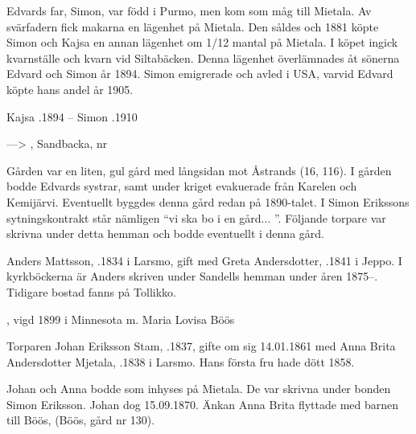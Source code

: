 Edvards far, Simon, var född i Purmo, men kom som måg till Mietala. Av svärfadern fick makarna en lägenhet på Mietala. Den såldes och 1881 köpte Simon och Kajsa en annan lägenhet om 1/12 mantal på Mietala. I köpet ingick kvarnställe och kvarn vid Siltabäcken. Denna lägenhet överlämnades åt sönerna Edvard och Simon år 1894. Simon emigrerade och avled i USA, varvid Edvard köpte hans andel år 1905.

Kajsa .1894  --	Simon .1910


--->	, Sandbacka, nr 

Gården var en liten, gul gård med långsidan mot Åstrands (16, 116).	I gården bodde Edvards systrar, samt under kriget evakuerade från Karelen och Kemijärvi. Eventuellt byggdes denna gård redan på 1890-talet. I Simon Erikssons sytningskontrakt står nämligen ``vi ska bo i en gård... ''. Följande torpare var skrivna under detta hemman och bodde eventuellt i denna gård.


Anders Mattsson, .1834 i Larsmo, gift med Greta Andersdotter, .1841 i Jeppo. I kyrkböckerna är Anders skriven under Sandells hemman under åren 1875--. Tidigare bostad fanns på Tollikko.
\begin{jhchildren}
  \item {}, vigd 1899 i  Minnesota m. Maria Lovisa Böös
  \item {}
\end{jhchildren}


Torparen Johan Eriksson Stam, .1837, gifte om sig 14.01.1861 med Anna Brita Andersdotter Mjetala,  .1838 i Larsmo. Hans första fru hade dött 1858.
\begin{jhchildren}
  \item {}
  \item {}
  \item {}
  \item {}
\end{jhchildren}

Johan och Anna bodde som inhyses på Mietala. De var skrivna under bonden Simon Eriksson. Johan dog 15.09.1870. Änkan Anna Brita flyttade med barnen till Böös, (Böös, gård nr 130).



